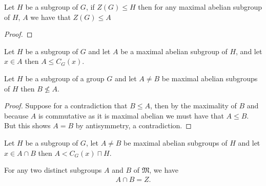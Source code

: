 \begin{lemma}
  \label{MaximalAbelianSubgroup.center_le}
  Let $H$ be a subgroup of $G$, if $Z(G) \le H$ then for any maximal abelian subgroup of $H$, $A$ we have that $Z(G) \le A$ 
  \leanok
\end{lemma}
\begin{proof}
  
\end{proof}

\begin{lemma}
\label{MaximalAbelianSubgroup.le_centralizer_of_mem}
\leanok
Let $H$ be a subgroup of $G$ and let $A$ be a maximal abelian subgroup of $H$, and let $x \in A$ then $A \le C_G(x)$.
\end{lemma}

\begin{lemma}
  \label{MaximalAbelianSubgroup.not_le_of_ne}
  \leanok
  Let $H$ be a subgroup of a group $G$ and let $A \ne B$ be maximal abelian subgroups of $H$ then $B \not\le A$.
\end{lemma}
\begin{proof}
Suppose for a contradiction that $B \le A$, then by the maximality of $B$ and because $A$ is commutative as it is maximal abelian we must have that $A \le B$.
But this shows $A = B$ by antisymmetry, a contradiction.
\end{proof}

\begin{lemma}
  \label{MaximalAbelianSubgroup.lt_cen_meet_G}
  \leanok
  Let $H$ be a subgroup of $G$, let $A \ne B$ be maximal abelian subgroups of $H$ and let $x \in A \cap B$ then $A < C_G(x) \sqcap H$.
\end{lemma}

\begin{theorem}
  \label{MaximalAbelianSubgroup.center_eq_meet_of_ne_MaximalAbelianSubgroups}
For any two distinct subgroups $A$ and $B$ of $\mathfrak{M}$, we have
\begin{align*} A \cap B = Z. \end{align*}
\end{theorem}

